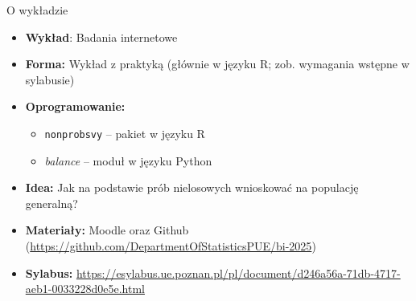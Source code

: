 \documentclass[10pt,ignorenonframetext, aspectratio=169]{beamer}
\begin{document}
\begin{frame}{O wykładzie}
    \begin{itemize}
        \item \textbf{Wykład}: Badania internetowe
        \item \textbf{Forma:} Wykład z praktyką (głównie w języku R; zob. wymagania wstępne w sylabusie)
        \item \textbf{Oprogramowanie:} 
        \begin{itemize}
            \item \texttt{nonprobsvy} -- pakiet w języku R
            \item \textit{balance} -- moduł w języku Python
        \end{itemize}
        \item \textbf{Idea:} Jak na podstawie prób nielosowych wnioskować na populację generalną? 
        \item \textbf{Materiały:} Moodle oraz Github (\url{https://github.com/DepartmentOfStatisticsPUE/bi-2025})
        \item \textbf{Sylabus:} \url{https://esylabus.ue.poznan.pl/pl/document/d246a56a-71db-4717-aeb1-0033228d0e5e.html}
    \end{itemize}
\end{frame}
\end{document}
